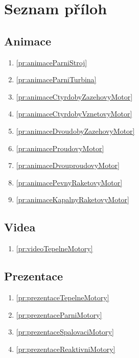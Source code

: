 \section{Seznam příloh}

\subsection*{Animace}
\begin{enumerate}[align=left, labelwidth=0cm, label={Příloha č. -- }\arabic*]
    \item \ref{pr:animaceParniStroj}
    \item \ref{pr:animaceParniTurbina}
    \item \ref{pr:animaceCtyrdobyZazehovyMotor}
    \item \ref{pr:animaceCtyrdobyVznetovyMotor}
    \item \ref{pr:animaceDvoudobyZazehovyMotor}
    \item \ref{pr:animaceProudovyMotor}
    \item \ref{pr:animaceDvouproudovyMotor}
    \item \ref{pr:animacePevnyRaketovyMotor}
    \item \ref{pr:animaceKapalnyRaketovyMotor}
\end{enumerate}

\subsection*{Videa}
\begin{enumerate}[align=left, labelwidth=0cm, label={Příloha č. -- }\arabic*, resume]
    \item \ref{pr:videoTepelneMotory}
\end{enumerate}

\subsection*{Prezentace}
\begin{enumerate}[align=left, labelwidth=0cm, label={Příloha č. -- }\arabic*, resume]
    \item \ref{pr:prezentaceTepelneMotory}
    \item \ref{pr:prezentaceParniMotory}
    \item \ref{pr:prezentaceSpalovaciMotory}
    \item \ref{pr:prezentaceReaktivniMotory}
\end{enumerate}

